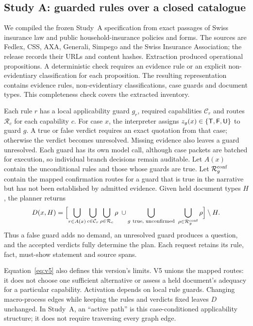 \subsection{Study A: guarded rules over a closed catalogue}
\label{sec:v5}
We compiled the frozen Study~A specification from \nPassages{} exact
passages of Swiss insurance law and public household-insurance policies
and forms. The sources are Fedlex, CSS, AXA, Generali, Simpego and the
Swiss Insurance Association; the release records their URLs and content
hashes. Extraction produced \nPropositions{} operational propositions.
A deterministic check requires an evidence rule or an explicit
non-evidentiary classification for each proposition. The resulting
representation contains \nRules{} evidence rules, \nNonEvidentiary{}
non-evidentiary classifications, \nGuards{} case guards and \nCatalogue{}
document types. This completeness check covers the extracted inventory.

Each rule $r$ has a local applicability guard $g_r$, required capabilities
$\mathcal C_r$ and routes $\mathcal R_c$ for each capability $c$. For case
$x$, the interpreter assigns $z_g(x)\in\{\mathsf{T},\mathsf{F},\mathsf{U}\}$ to guard $g$.
A true or false verdict requires an exact quotation from that case;
otherwise the verdict becomes unresolved. Missing evidence also leaves a
guard unresolved. Each guard has its own model call, although case packets
are batched for execution, so individual branch decisions remain auditable.
Let $A(x)$ contain the unconditional rules and those whose guards are true.
Let $\mathcal R^{\rm conf}_g$ contain the mapped confirmation routes for a
guard that is true in the narrative but has not been established by admitted
evidence. Given held document types $H$, the planner returns
\begin{equation}
D(x,H)=\Bigl[\bigcup_{r\in A(x)}\bigcup_{c\in\mathcal C_r}\bigcup_{\rho\in\mathcal R_c}\rho
\;\cup\bigcup_{g\ \text{true, unconfirmed}}\ \bigcup_{\rho\in\mathcal R^{\rm conf}_g}\rho\Bigr]\setminus H .
\label{eq:v5}
\end{equation}
Thus a false guard adds no demand, an unresolved guard produces a question,
and the accepted verdicts fully determine the plan. Each request retains
its rule, fact, must-show statement and source spans.

Equation~\ref{eq:v5} also defines this version's limits. V5 unions the
mapped routes: it does not choose one sufficient alternative or assess a
held document's adequacy for a particular capability. Activation depends on
local rule guards. Changing macro-process edges while keeping the rules
and verdicts fixed leaves $D$ unchanged. In Study~A, an ``active path'' is
this case-conditioned applicability structure; it does not require
traversing every graph edge.

